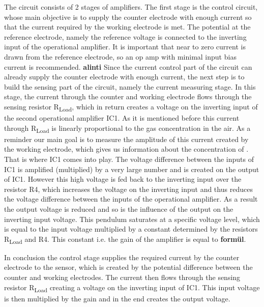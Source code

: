 The circuit consists of 2 stages of amplifiers. The first stage is the control circuit, whose main objective is to supply the counter electrode with enough current so that the current required by the working electrode is met. The potential at the reference electrode, namely the reference voltage is connected to the inverting input of the operational amplifier. It is important that near to zero current is drawn from the reference electrode, so an op amp with minimal input bias current is recommended. \textbf{alinti}
Since the current control part of the circuit can already supply the counter electrode with enough current, the next step is to build the sensing part of the circuit, namely the current measuring stage. In this stage, the current through the counter and working electrode flows through the sensing resistor R\textsubscript{Load}, which in return creates a voltage on the inverting input of the second operational amplifier IC1. As it is mentioned before this current through R\textsubscript{Load} is linearly proportional to the gas concentration in the air. As a reminder our main goal is to measure the amplitude of this current created by the working electrode, which gives us information about the concentration of . That is where IC1 comes into play. The voltage difference between the inputs of IC1 is amplified (multiplied) by a very large number and is created on the output of IC1. However this high voltage is fed back to the inverting input over the resistor R4, which increases the voltage on the inverting input and thus reduces the voltage difference between the inputs of the operational amplifier. As a result the output voltage is reduced and so is the influence of the output on the inverting input voltage. This pendulum saturates at a specific voltage level, which is equal to the input voltage multiplied by a constant determined by the resistors R\textsubscript{Load} and R4. This constant i.e. the gain of the amplifier is equal to \textbf{formül}. \par
In conclusion the control stage supplies the required current by the counter electrode to the sensor, which is created by the potential difference between the counter and working electrodes. The current then flows through the sensing resistor  R\textsubscript{Load} creating a voltage on the inverting input of IC1. This input voltage is then multiplied by the gain and in the end creates the output voltage.

